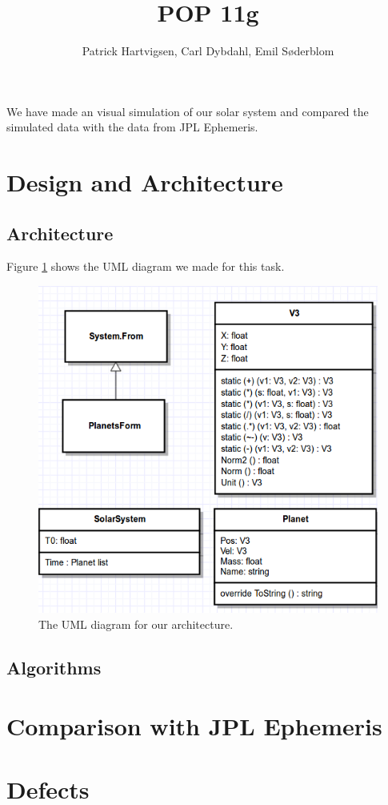 \documentclass[a4paper]{article}
\title{POP 11g}
\author{Patrick Hartvigsen, Carl Dybdahl, Emil Søderblom}
\begin{document}
\maketitle

We have made an visual simulation of our solar system and compared the simulated data with the data from JPL Ephemeris.

\section{Design and Architecture}

\subsection{Architecture}

Figure \ref{uml} shows the UML diagram we made for this task. 

\begin{figure}[!ht]
\centering
\includegraphics{uml.png}
\caption{The UML diagram for our architecture.}
\label{uml}
\end{figure}

\subsection{Algorithms}



\section{Comparison with JPL Ephemeris}

\section{Defects}
\end{document}
